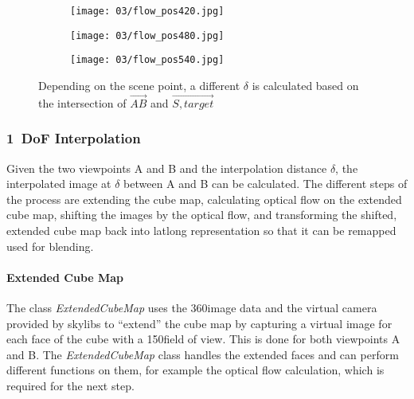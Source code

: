 \begin{figure}
\centering
    \hfill
    \begin{subfigure}[t]{0.33\textwidth}            
            \centering
            \texttt{[image: 03/flow\_pos420.jpg]}
            \caption{}
    \end{subfigure}%
    \hfill
    \begin{subfigure}[t]{0.33\textwidth}
            \centering
            \texttt{[image: 03/flow\_pos480.jpg]}
            \caption{}
    \end{subfigure}
    \hfill
    \begin{subfigure}[t]{0.33\textwidth}
            \centering
            \texttt{[image: 03/flow\_pos540.jpg]}
            \caption{}
    \end{subfigure}
    \hfill
    \caption[Different examples of $\delta$]{Depending on the scene point, a different $\delta$ is calculated based on the intersection of $\overrightarrow{AB}$ and $\overrightarrow{S,target}$} \label{fig:flow_pos}
\end{figure}

\subsubsection{1~DoF Interpolation}
Given the two viewpoints A and B and the interpolation distance $\delta$, the interpolated image at $\delta$ between A and B can be calculated. The different steps of the process are extending the cube map, calculating optical flow on the extended cube map, shifting the images by the optical flow, and transforming the shifted, extended cube map back into latlong representation so that it can be remapped used for blending.

\paragraph{Extended Cube Map}
The class \emph{ExtendedCubeMap} uses the 360\degree image data and the virtual camera provided by skylibs \cite{skylibs} to ``extend'' the cube map by capturing a virtual image for each face of the cube with a 150\degree field of view. This is done for both viewpoints A and B. The \emph{ExtendedCubeMap} class handles the extended faces and can perform different functions on them, for example the optical flow calculation, which is required for the next step.

